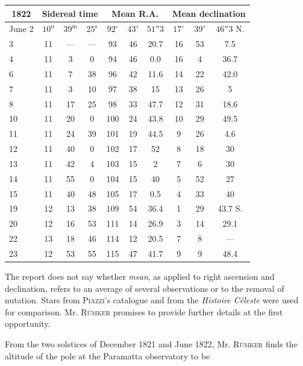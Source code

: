 \begin{center}
\small\setlength{\tabcolsep}{3pt}
\begin{tabular}{l|ccc|ccc|ccc}
\multicolumn{1}{c|}{1822} & \multicolumn{3}{c|}{Sidereal time} & \multicolumn{3}{c|}{Mean R.A.} & \multicolumn{3}{c}{Mean declination} \\
\hline
June 2 & $10^{\mathrm{u}}$ & $39^{\mathrm{m}}$ & $25^{\mathrm{s}}$ & $92^{\circ}$ & $43'$ & $51''3$ & $17^{\circ}$ & $39'$ & $46''3$ N. \\
3 & 11 & --- & --- & 93 & 46 & 20.7 & 16 & 53 & 7.5 \\
4 & 11 & 3 & 0 & 94 & 46 & 0.0 & 16 & 4 & 36.7 \\
6 & 11 & 7 & 38 & 96 & 42 & 11.6 & 14 & 22 & 42.0 \\
7 & 11 & 3 & 10 & 97 & 38 & 15 & 13 & 26 & 5 \\
8 & 11 & 17 & 25 & 98 & 33 & 47.7 & 12 & 31 & 18.6 \\
10 & 11 & 20 & 0 & 100 & 24 & 43.8 & 10 & 29 & 49.5 \\
11 & 11 & 24 & 39 & 101 & 19 & 44.5 & 9 & 26 & 4.6 \\
12 & 11 & 40 & 0 & 102 & 17 & 52 & 8 & 18 & 30 \\
13 & 11 & 42 & 4 & 103 & 15 & 2 & 7 & 6 & 30 \\
14 & 11 & 55 & 0 & 104 & 15 & 40 & 5 & 52 & 27 \\
15 & 11 & 40 & 48 & 105 & 17 & 0.5 & 4 & 33 & 40 \\
19 & 12 & 13 & 38 & 109 & 54 & 36.4 & 1 & 29 & 43.7 S. \\
20 & 12 & 16 & 53 & 111 & 14 & 26.9 & 3 & 14 & 29.1 \\
22 & 13 & 18 & 46 & 114 & 12 & 20.5 & 7 & 8 & --- \\
23 & 12 & 53 & 55 & 115 & 47 & 41.7 & 9 & 9 & 48.4 \\
\end{tabular}
\end{center}

The report does not say whether \emph{mean}, as applied to right ascension and declination, refers to an average of several observations or to the removal of nutation. Stars from \textsc{Piazzi}’s catalogue and from the \emph{Histoire Céleste} were used for comparison. Mr. \textsc{Rümker} promises to provide further details at the first opportunity.

From the two solstices of December 1821 and June 1822, Mr. \textsc{Rümker} finds the altitude of the pole at the Paramatta observatory to be

